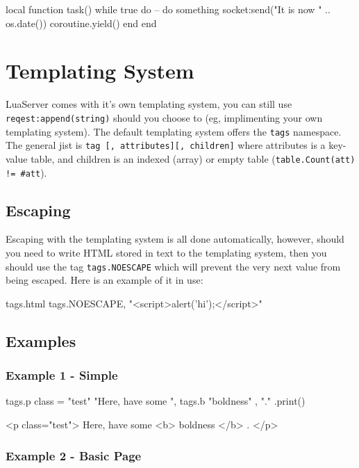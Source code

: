 \documentclass[a4paper,11pt]{report}
\newcommand{\inlinecode}{\texttt}
\begin{document}
\begin{lua}
local function task()
	while true do
		-- do something
		socket:send("It is now " .. os.date())
		coroutine.yield()
	end
end
\end{lua}

\chapter{Templating System}

LuaServer comes with it's own templating system, you can still use \inlinecode{reqest:append(string)} should you choose to (eg, implimenting your own templating system).
The default templating system offers the \inlinecode{tags} namespace.
The general jist is \inlinecode{tag [, attributes][, children]} where attributes is a key-value table, and children is an indexed (array) or empty table (\inlinecode{table.Count(att) != \#att}).

\section{Escaping}
Escaping with the templating system is all done automatically, however, should you need to write HTML stored in text to the templating system, then you should use the tag \inlinecode{tags.NOESCAPE} which will prevent the very next value from being escaped. Here is an example of it in use:

\begin{lua}
tags.html
{
	tags.NOESCAPE, "<script>alert('hi');</script>"
}
\end{lua}

\section{Examples}

\subsection{Example 1 - Simple}

\begin{lua}
tags.p { class = "test" }
{
  "Here, have some ", tags.b{ "boldness" }, "."
}.print()
\end{lua}

\begin{html}
<p class="test">
	Here, have some 
	<b>
		boldness
	</b>
	.
</p>
\end{html}

\subsection{Example 2 - Basic Page}
\end{document}
